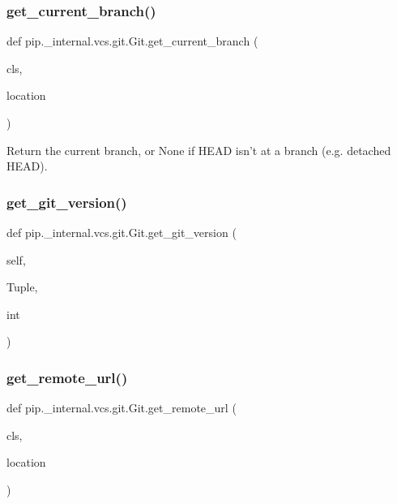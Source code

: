 \subsubsection{\texorpdfstring{get\+\_\+current\+\_\+branch()}{get\_current\_branch()}}
{\footnotesize\ttfamily def pip.\+\_\+internal.\+vcs.\+git.\+Git.\+get\+\_\+current\+\_\+branch (\begin{DoxyParamCaption}\item[{}]{cls,  }\item[{}]{location }\end{DoxyParamCaption})}

\begin{DoxyVerb}Return the current branch, or None if HEAD isn't at a branch
(e.g. detached HEAD).
\end{DoxyVerb}
 \mbox{\label{classpip_1_1__internal_1_1vcs_1_1git_1_1Git_ad237bd25668f1d0169ed3f5c1ddb7363}} 
\subsubsection{\texorpdfstring{get\+\_\+git\+\_\+version()}{get\_git\_version()}}
{\footnotesize\ttfamily def pip.\+\_\+internal.\+vcs.\+git.\+Git.\+get\+\_\+git\+\_\+version (\begin{DoxyParamCaption}\item[{}]{self,  }\item[{}]{Tuple,  }\item[{}]{int }\end{DoxyParamCaption})}

\mbox{\label{classpip_1_1__internal_1_1vcs_1_1git_1_1Git_aa3a873cb459126b2c2ff6af3b481ae01}} 
\subsubsection{\texorpdfstring{get\+\_\+remote\+\_\+url()}{get\_remote\_url()}}
{\footnotesize\ttfamily def pip.\+\_\+internal.\+vcs.\+git.\+Git.\+get\+\_\+remote\+\_\+url (\begin{DoxyParamCaption}\item[{}]{cls,  }\item[{}]{location }\end{DoxyParamCaption})}


